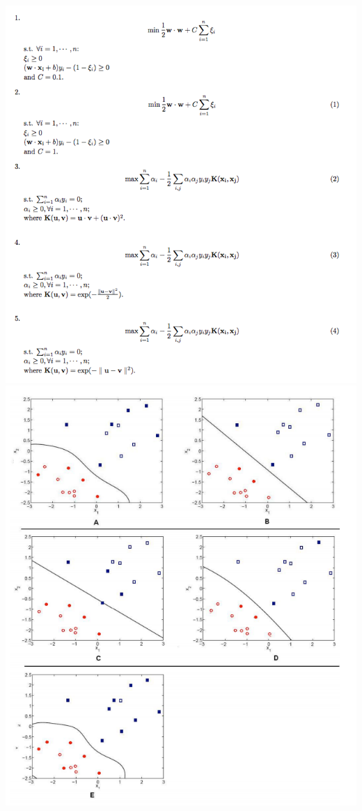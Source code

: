 \documentclass[12pt,a4paper]{article}
\begin{document}
\begin{center}
\includegraphics[scale=0.38]{images/svm_equations.png}
\includegraphics[scale=0.35]{images/svm_plots.png}
\end{center}
\end{document}
